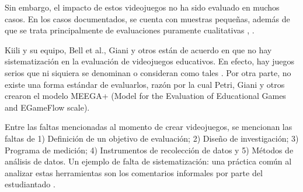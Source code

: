 Sin embargo, el impacto de estos videojuegos no ha sido evaluado en muchos casos. En los casos documentados, se cuenta con muestras pequeñas, además de que se trata principalmente de evaluaciones puramente cualitativas \cite{video_game_foster_computational_thinking}, \cite{effectiveness_gbl}.

Kiili y su equipo, Bell et al., Giani y otros \cite{petri2018method} están de acuerdo en que no hay sistematización en la evaluación de videojuegos educativos. En efecto, hay juegos serios que ni siquiera se denominan o consideran como tales \cite{evaluation_of_games_for_teaching_cs}. Por otra parte, no existe una forma estándar de evaluarlos, razón por la cual Petri, Giani y otros \cite{petri2018method} crearon el modelo MEEGA+ (Model for the Evaluation of Educational Games and EGameFlow scale).

Entre las faltas mencionadas al momento de crear videojuegos, se mencionan las faltas de 1) Definición de un objetivo de evaluación; 2) Diseño de investigación; 3) Programa de medición; 4) Instrumentos de recolección de datos y 5) Métodos de análisis de datos. Un ejemplo de falta de sistematización: una práctica común al analizar estas herramientas son los comentarios informales por parte del estudiantado \cite{petri2018method}.





